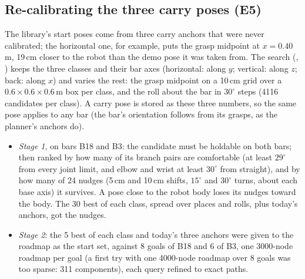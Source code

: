 \subsection{Re-calibrating the three carry poses (E5)}
\label{sec:e5}

The library's start poses come from three carry anchors that were never
calibrated; the horizontal one, for example, puts the grasp midpoint at
$x = 0.40$\,m, 19\,cm closer to the robot than the demo pose it was taken from.
The search (, )
keeps the three classes and their bar axes (horizontal: along $y$; vertical:
along $z$; back: along $x$) and varies the rest: the grasp midpoint on a 10\,cm
grid over a $0.6 \times 0.6 \times 0.6$\,m box per class, and the roll about the
bar in $30^\circ$ steps (4116 candidates per class). A carry pose is stored as
these three numbers, so the same pose applies to any bar (the bar's orientation
follows from its grasps, as the planner's anchors do).
\begin{itemize}[nosep]
  \item \emph{Stage 1}, on bars B18 and B3: the candidate must be holdable on both
        bars; then ranked by how many of its branch pairs are comfortable (at least
        $29^\circ$ from every joint limit, and elbow and wrist at least $30^\circ$
        from straight), and by how many of 24 nudges (5\,cm and 10\,cm shifts,
        $15^\circ$ and $30^\circ$ turns, about each base axis) it survives. A pose
        close to the robot body loses its nudges toward the body. The 30 best of each
        class, spread over places and rolls, plus today's anchors, got the nudges.
  \item \emph{Stage 2}: the 5 best of each class and today's three anchors were
        given to the roadmap as the start set, against 8 goals of B18 and 6 of B3,
        one 3000-node roadmap per goal (a first try with one 4000-node roadmap over
        8 goals was too sparse: 311 components), each query refined to exact paths.
\end{itemize}

\begin{table}[h]
\centering
\footnotesize
\setlength{\tabcolsep}{3pt}
\caption{The carry search, one column per class. Midpoints in the mobile-base frame;
``goals with an exact path'' count, over the 14 goals of stage 2, those the carry pose
reaches with a path that holds the bar exactly.}
\label{tab:carrysearch}

\end{table}

